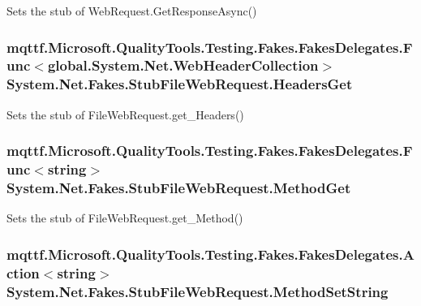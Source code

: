 Sets the stub of Web\-Request.\-Get\-Response\-Async()

\hypertarget{class_system_1_1_net_1_1_fakes_1_1_stub_file_web_request_a691a711fabba0ce0dfa0aac2248b3359}{
\subsubsection[{Headers\-Get}]{\setlength{\rightskip}{0pt plus 5cm}mqttf.\-Microsoft.\-Quality\-Tools.\-Testing.\-Fakes.\-Fakes\-Delegates.\-Func$<$global.\-System.\-Net.\-Web\-Header\-Collection$>$ System.\-Net.\-Fakes.\-Stub\-File\-Web\-Request.\-Headers\-Get}}\label{class_system_1_1_net_1_1_fakes_1_1_stub_file_web_request_a691a711fabba0ce0dfa0aac2248b3359}


Sets the stub of File\-Web\-Request.\-get\-\_\-\-Headers()

\hypertarget{class_system_1_1_net_1_1_fakes_1_1_stub_file_web_request_a4ddb19151e6048958269631b13769781}{
\subsubsection[{Method\-Get}]{\setlength{\rightskip}{0pt plus 5cm}mqttf.\-Microsoft.\-Quality\-Tools.\-Testing.\-Fakes.\-Fakes\-Delegates.\-Func$<$string$>$ System.\-Net.\-Fakes.\-Stub\-File\-Web\-Request.\-Method\-Get}}\label{class_system_1_1_net_1_1_fakes_1_1_stub_file_web_request_a4ddb19151e6048958269631b13769781}


Sets the stub of File\-Web\-Request.\-get\-\_\-\-Method()

\hypertarget{class_system_1_1_net_1_1_fakes_1_1_stub_file_web_request_a4f97e7ce92a357c9c9814a0f91b50cfd}{
\subsubsection[{Method\-Set\-String}]{\setlength{\rightskip}{0pt plus 5cm}mqttf.\-Microsoft.\-Quality\-Tools.\-Testing.\-Fakes.\-Fakes\-Delegates.\-Action$<$string$>$ System.\-Net.\-Fakes.\-Stub\-File\-Web\-Request.\-Method\-Set\-String}}\label{class_system_1_1_net_1_1_fakes_1_1_stub_file_web_request_a4f97e7ce92a357c9c9814a0f91b50cfd}


